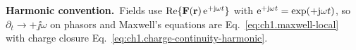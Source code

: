 \setcounter{section}{-1}
\renewcommand{\thesection}{\thechapter.\arabic{section}}
\renewcommand{\thesubsection}{\thesection.\arabic{subsection}}

\noindent\textbf{Harmonic convention.}\ 
Fields use $\Re\{\mathbf{F}(\mathbf{r})\,\mathrm{e}^{+\mathrm{j}\omega t}\}$ with $\mathrm{e}^{+\mathrm{j}\omega t}=\exp(+\mathrm{j}\omega t)$, so $\partial_t\to+\jj\omega$ on phasors and Maxwell's equations are Eq.~\eqref{eq:ch1.maxwell-local} with charge closure Eq.~\eqref{eq:ch1.charge-continuity-harmonic}.
\par\medskip
